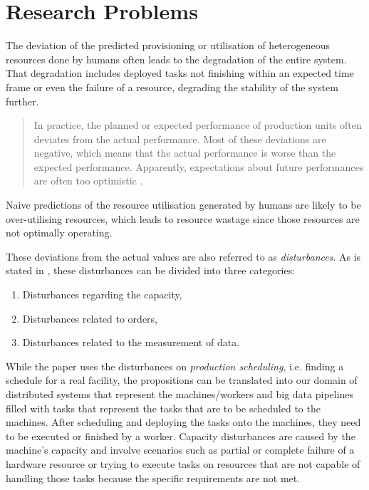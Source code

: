         \section{Research Problems}
        \label{sec:research-problems-introduction}

            The deviation of the predicted provisioning or utilisation of heterogeneous resources done by humans often leads to the degradation of the entire system. That degradation includes deployed tasks not finishing within an expected time frame or even the failure of a resource, degrading the stability of the system further.
            \begin{quote}
                In practice, the planned or expected performance of production units often deviates from the actual performance. Most of these deviations are negative, which means that the actual performance is worse than the expected performance. Apparently, expectations about future performances are often too optimistic \cite{stoopComplexitySchedulingPractice1996}.
            \end{quote}
            Naive predictions of the resource utilisation generated by humans are likely to be over-utilising resources, which leads to resource wastage since those resources are not optimally operating. 
            
            These deviations from the actual values are also referred to as \emph{disturbances}.
            As is stated in \cite{stoopComplexitySchedulingPractice1996}, these disturbances can be divided into three categories:
            \begin{enumerate}
                \item Disturbances regarding the capacity,
                \item Disturbances related to orders,
                \item Disturbances related to the measurement of data.
            \end{enumerate}
            While the paper uses the disturbances on \emph{production scheduling}, i.e. finding a schedule for a real facility, the propositions can be translated into our domain of distributed systems that represent the machines/workers and big data pipelines filled with tasks that represent the tasks that are to be scheduled to the machines. After scheduling and deploying the tasks onto the machines, they need to be executed or finished by a worker.
            Capacity disturbances are caused by the machine's capacity and involve scenarios such as partial or complete failure of a hardware resource or trying to execute tasks on resources that are not capable of handling those tasks because the specific requirements are not met.
        
